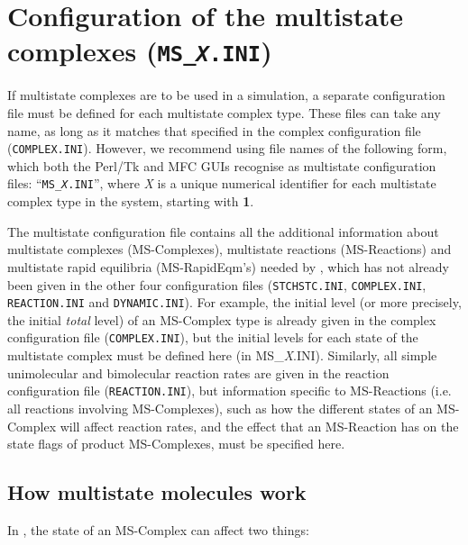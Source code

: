 \section{Configuration of the multistate complexes (\texttt{MS\_\emph{X}.INI})}
\label{ms_ini}

If multistate complexes are to be used in a simulation, a separate
configuration file must be defined for each multistate complex type.
These files can take any name, as long as it matches that specified in
the complex configuration file (\texttt{COMPLEX.INI}).  However, we recommend
using file names of the following form, which both the Perl/Tk and
MFC GUIs recognise as multistate configuration files:
``\texttt{MS\_\emph{X}.INI}'', where \emph{X} is a unique numerical identifier
for each multistate complex type in the system, starting with
\textbf{1}.\par

The multistate configuration file contains all the additional
information about multistate complexes (MS-Complexes), multistate
reactions (MS-Reactions) and multistate rapid equilibria
(MS-RapidEqm's) needed by \stochsim{}, which has not already been given
in the other four configuration files (\texttt{STCHSTC.INI}, \texttt{COMPLEX.INI},
\texttt{REACTION.INI} and \texttt{DYNAMIC.INI}).  For example, the initial level (or
more precisely, the initial \emph{total} level) of an MS-Complex type
is already given in the complex configuration file (\texttt{COMPLEX.INI}), but
the initial levels for each state of the multistate complex must be
defined here (in MS\_\emph{X}.INI).  Similarly, all simple
unimolecular and bimolecular reaction rates are given in the reaction
configuration file (\texttt{REACTION.INI}), but information specific to
MS-Reactions (i.e. all reactions involving MS-Complexes), such as how
the different states of an MS-Complex will affect reaction rates, and
the effect that an MS-Reaction has on the state flags of product
MS-Complexes, must be specified here.

\subsection{How multistate molecules work}
In \stochsim{}, the state of an MS-Complex can affect two things:

